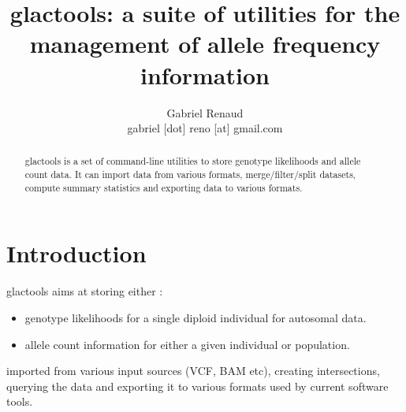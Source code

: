 \documentclass[a4paper]{article}
\title{glactools: a suite of utilities for the management of allele frequency information}
\author{Gabriel Renaud \\
gabriel [dot] reno [at]  gmail.com}
\date{}
\begin{document}
\maketitle

\begin{abstract}
glactools is a set of command-line utilities to store genotype likelihoods and allele count data. It can import data from various formats, merge/filter/split datasets, compute summary statistics and exporting data to various formats.
\end{abstract}

\tableofcontents

\section{Introduction}

glactools aims at storing either :
\begin{itemize}
\item genotype likelihoods for a single diploid individual for autosomal data.
\item allele count information for either a given individual or population.
\end{itemize}
imported from various input sources (VCF, BAM etc), creating intersections, querying the data and exporting it to various formats used by current software tools.
\end{document}
